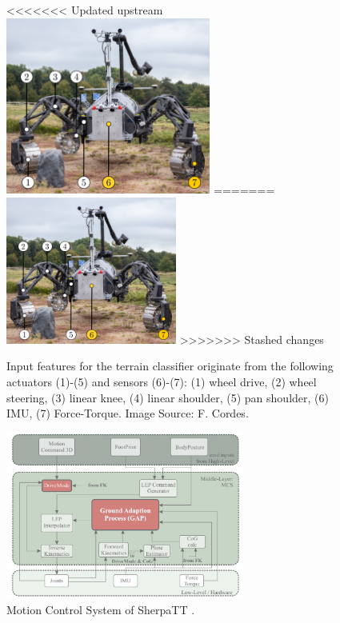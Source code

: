 \documentclass{article}
\begin{document}
\begin{figure}[h]
\centering
<<<<<<< Updated upstream
\includegraphics[width=0.6\textwidth]{../figures/terrain_classifier_sensor_inputs.png}
=======
\includegraphics[width=0.5\textwidth]{../figures/terrain_classifier_sensor_inputs.png}
>>>>>>> Stashed changes
\caption{\label{fig:SensorInputs}Input features for the terrain classifier originate from the following actuators (1)-(5) and sensors (6)-(7): (1) wheel drive, (2) wheel steering, (3) linear knee, (4) linear shoulder, (5) pan shoulder, (6) IMU, (7) Force-Torque. Image Source: F. Cordes.}
\end{figure}

\begin{figure}[h]
\centering
\includegraphics[width=0.7\textwidth]{../figures/MCS-Structure.pdf}
\caption{\label{fig:MCS}Motion Control System of SherpaTT \cite{cordes_phd_2018}.}
\end{figure}
\end{document}
